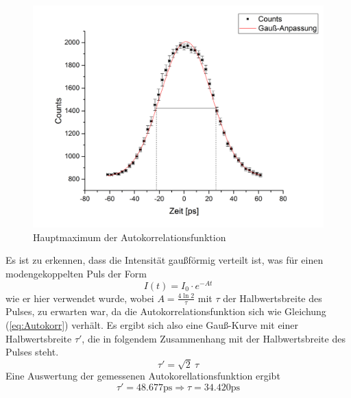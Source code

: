\begin{figure}[H]
	\begin{center}
		\includegraphics[scale=.5]{Bilder/Autokorr2.png}
		\caption{Hauptmaximum der Autokorrelationsfunktion}
		\label{aut2}
	\end{center}
\end{figure}
Es ist zu erkennen, dass die Intensität gaußförmig verteilt ist, was für einen modengekoppelten Puls der Form
\begin{equation*}
I(t)=I_0\cdot e^{-At}
\end{equation*}
wie er hier verwendet wurde, wobei $A=\frac{4\ln2}{\tau}$ mit $\tau$ der Halbwertsbreite des Pulses, zu erwarten war, da die Autokorrelationsfunktion sich wie Gleichung (\ref{eq:Autokorr}) verhält.
Es ergibt sich also eine Gauß-Kurve mit einer Halbwertsbreite $\tau'$, die in folgendem Zusammenhang mit der Halbwertsbreite des Pulses steht.
\begin{equation}
\tau'=\sqrt{2}\:\tau
\end{equation}
Eine Auswertung der gemessenen Autokorellationsfunktion ergibt 
\begin{equation}
\tau'=48.677\text{ps}\Longrightarrow\tau=34.420\text{ps}
\end{equation}
